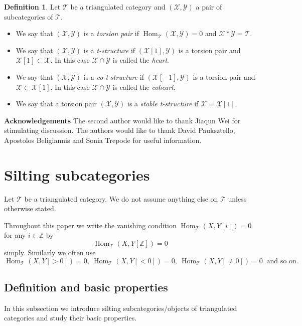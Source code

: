 \documentclass[a4paper,reqno]{amsart}
\theoremstyle{definition}
\newtheorem{definition}[theorem]{Definition}
\newcommand{\TT}{{\mathcal T}}
\newcommand{\XX}{{\mathcal X}}
\newcommand{\YY}{{\mathcal Y}}
\newcommand{\Z}{\mathbb{Z}}
\newcommand{\Hom}{\operatorname{Hom}\nolimits}
\begin{document}
\begin{definition}
Let $\TT$ be a triangulated category and $(\XX,\YY)$ a pair of subcategories of $\TT$.
\begin{itemize}
\item We say that $(\XX,\YY)$ is a \emph{torsion pair} 
if $\Hom_{\TT}(\XX,\YY)=0$ and $\XX*\YY=\TT$.
\item We say that $(\XX,\YY)$ is a \emph{t-structure} \cite{BBD}
if $(\XX[1],\YY)$ is a torsion pair and $\XX[1]\subset\XX$.
In this case $\XX\cap\YY$ is called the \emph{heart}.
\item We say that $(\XX,\YY)$ is a \emph{co-t-structure} \cite{P1} 
if $(\XX[-1],\YY)$ is a torsion pair and $\XX\subset\XX[1]$.
In this case $\XX\cap\YY$ is called the \emph{coheart}.
\item We say that a torsion pair $(\XX,\YY)$ is a \emph{stable t-structure} 
\cite{M} if $\XX=\XX[1]$.
\end{itemize}
\end{definition}


\medskip
\noindent
{\bf Acknowledgements }
The second author would like to thank Jiaqun Wei for stimulating discussion.
The authors would like to thank David Pauksztello, Apostolos Beligiannis and Sonia Trepode for useful information.


\section{Silting subcategories}\label{section: silting subcategories}

Let $\TT$ be a triangulated category. We do not assume anything else on $\TT$ unless otherwise stated.

Throughout this paper we write the vanishing condition $\Hom_{\TT}(X,Y[i])=0$ for any $i\in\Z$ by
\[\Hom_{\TT}(X,Y[\Z])=0\]
simply.  Similarly we often use
\[\Hom_{\TT}(X,Y[>0])=0,\ \Hom_{\TT}(X,Y[<0])=0,\ \Hom_{\TT}(X,Y[\neq0])=0\ \mbox{ and so on.}\]

\subsection{Definition and basic properties}

In this subsection we introduce silting subcategories/objects of triangulated categories
and study their basic properties.
\end{document}
